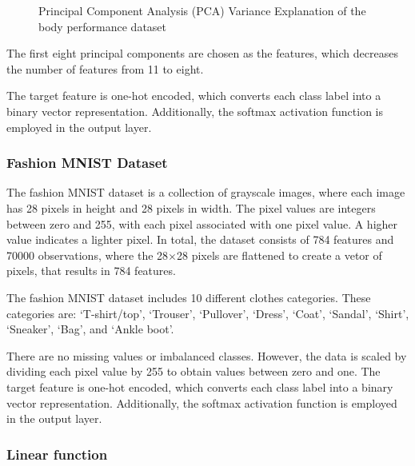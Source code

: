 \documentclass[10pt, conference]{IEEEtran}
\begin{document}
\begin{figure}[H]
    \centering
    \hfil
    \caption{Principal Component Analysis (PCA) Variance Explanation of the body performance dataset}
    \label{fig:pca-variance-body-performance}
\end{figure}
The first eight principal components are chosen as the features, which decreases the number of features from 11 to
eight.

The target feature is one-hot encoded, which converts each class label into a binary vector representation.
Additionally, the softmax activation function is employed in the output layer.

\subsubsection{Fashion MNIST Dataset}

The fashion MNIST dataset is a collection of grayscale images, where each image has 28 pixels in height and 28 pixels in width.
The pixel values are integers between zero and 255, with each pixel associated with one pixel value. A higher value
indicates a lighter pixel. In total, the dataset consists of 784 features and 70000 observations, where the 28$\times$28
pixels are flattened to create a vetor of pixels, that results in 784 features.

The fashion MNIST dataset includes 10 different clothes categories. These categories are: `T-shirt/top',
`Trouser', `Pullover', `Dress', `Coat', `Sandal', `Shirt', `Sneaker', `Bag', and `Ankle boot'.

There are no missing values or imbalanced classes. However, the data is scaled by dividing each pixel value
by 255 to obtain values between zero and one. The target feature is one-hot encoded, which converts each class
label into a binary vector representation. Additionally, the softmax activation function is employed in the output
layer.

\subsubsection{Linear function}
\end{document}
